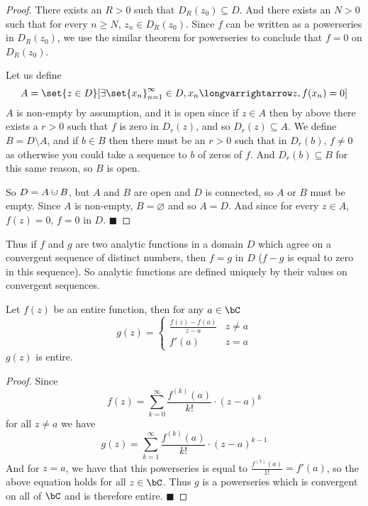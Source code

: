 \documentclass[10pt]{article}
\let\longto=\longvarrightarrow
\def\qed{\hskip1cm\hbox{}\hfill$\blacksquare$}
\begin{document}
\begin{proof}

    There exists an $R>0$ such that $D_R(z_0)\subseteq D$.
    And there exists an $N>0$ such that for every $n\geq N$, $z_n\in D_R(z_0)$.
    Since $f$ can be written as a powerseries in $D_R(z_0)$, we use the similar theorem for powerseries to conclude that $f=0$ on $D_R(z_0)$.

    Let us define
    \[ A = \set{z\in D}[\exists\set{x_n}_{n=1}^\infty\in D,x_n\longto z, f(x_n)=0] \]
    $A$ is non-empty by assumption, and it is open since if $z\in A$ then by above there exists a $r>0$ such that $f$ is zero in $D_r(z)$, and so $D_r(z)\subseteq A$.
    We define $B=D\setminus A$, and if $b\in B$ then there must be an $r>0$ such that in $D_r(b)$, $f\neq0$ as otherwise you could take a sequence to $b$
    of zeros of $f$.
    And $D_r(b)\subseteq B$ for this same reason, so $B$ is open.

    So $D=A\dcup B$, but $A$ and $B$ are open and $D$ is connected, so $A$ or $B$ must be empty.
    Since $A$ is non-empty, $B=\varnothing$ and so $A=D$.
    And since for every $z\in A$, $f(z)=0$, $f=0$ in $D$.
    \qed

\end{proof}

Thus if $f$ and $g$ are two analytic functions in a domain $D$ which agree on a convergent sequence of distinct numbers, then $f=g$ in $D$ ($f-g$ is equal to zero in this sequence).
So analytic functions are defined uniquely by their values on convergent sequences.

\begin{prop*}

    Let $f(z)$ be an entire function, then for any $a\in\bC$
    \[ g(z) = \begin{cases} \frac{f(z)-f(a)}{z-a} & z\neq a \\ f'(a) & z=a \end{cases} \]
    $g(z)$ is entire.

\end{prop*}

\begin{proof}

    Since
    \[ f(z) = \sum_{k=0}^\infty \frac{f^{(k)}(a)}{k!}\cdot(z-a)^k \]
    for all $z\neq a$ we have
    \[ g(z) = \sum_{k=1}^\infty \frac{f^{(k)}(a)}{k!}\cdot(z-a)^{k-1} \]
    And for $z=a$, we have that this powerseries is equal to $\frac{f^{(1)}(a)}{1!}=f'(a)$, so the above equation holds for all $z\in\bC$.
    Thus $g$ is a powerseries which is convergent on all of $\bC$ and is therefore entire.
    \qed

\end{proof}
\end{document}

